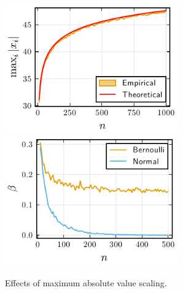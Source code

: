 \documentclass[aspectratio=1610,onlytextwidth]{beamer}
\begin{document}
\begin{frame}[c]
\begin{columns}
\begin{column}{0.45\textwidth}
    \end{column}
    \begin{column}{0.45\textwidth}
      \begin{figure}[htpb]
        \centering
        \includegraphics[width=0.7\textwidth]{figures/maxabs_gev.pdf}
        \includegraphics[width=0.7\textwidth]{figures/maxabs_n.pdf}
        \caption{%
          Effects of maximum absolute value scaling.
        }
      \end{figure}
    \end{column}
  \end{columns}

\end{frame}
\end{document}
